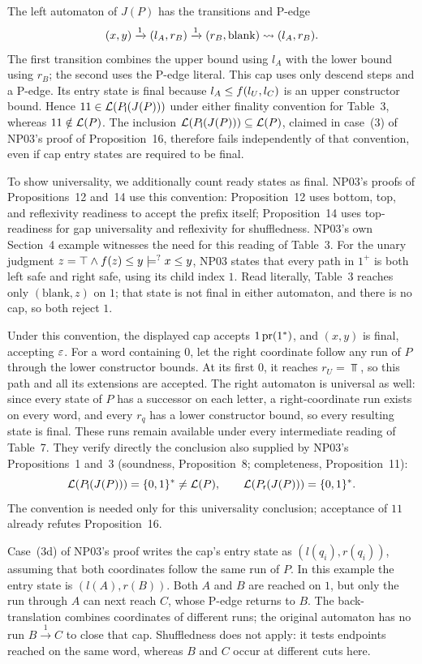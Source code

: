 The left automaton of $J(P)$ has the transitions and P-edge
\[
 (x,y)\xrightarrow{1}(l_A,r_B)
       \xrightarrow{1}(r_B,\text{blank})
       \rightsquigarrow(l_A,r_B).
\]
The first transition combines the upper bound using $l_A$ with the lower
bound using $r_B$; the second uses the P-edge literal.
This cap uses only descend steps and a P-edge. Its entry state is final
because $l_A\le f(l_U,l_C)$ is an upper constructor bound.
Hence $11\in\mathcal{L}(P_{\mathsf l}(J(P)))$ under either finality convention
for Table~3, whereas $11\notin\mathcal{L}(P)$. The inclusion
$\mathcal{L}(P_{\mathsf l}(J(P)))\subseteq\mathcal{L}(P)$, claimed in case~(3) of
NP03's proof of Proposition~16, therefore fails independently of that
convention, even if cap entry states are required to be final.

To show universality, we additionally count ready states as final.
NP03's proofs of Propositions~12 and~14 use this convention:
Proposition~12 uses bottom, top, and reflexivity readiness to accept
the prefix itself; Proposition~14 uses top-readiness for gap universality
and reflexivity for shuffledness. NP03's own Section~4 example witnesses
the need for this reading of Table~3. For the unary judgment
$z=\top\wedge f(z)\le y \models^{?} x \le y$, NP03 states that every path in
$1^+$ is both left safe and right safe, using its child index $1$.
Read literally, Table~3 reaches only $(\text{blank},z)$ on $1$;
that state is not final in either automaton, and there is no cap, so
both reject $1$.

Under this convention, the displayed cap accepts $1\operatorname{pr}(1^*)$, and
$(x,y)$ is final, accepting $\varepsilon$.
For a word containing $0$, let the right coordinate follow any run of
$P$ through the lower constructor bounds. At its first $0$, it reaches
$r_U=\Top$, so this path and all its extensions are accepted.
The right automaton is universal as well: since every state of $P$ has
a successor on each letter, a right-coordinate run exists on every word,
and every $r_q$ has a lower
constructor bound, so every resulting state is final.
These runs remain available under every intermediate reading of Table~7.
They verify directly the conclusion also supplied by NP03's
Propositions~1 and~3 (soundness, Proposition~8; completeness,
Proposition~11):
\[
 \mathcal{L}(P_{\mathsf l}(J(P)))=\{0,1\}^*\ne\mathcal{L}(P),
 \qquad \mathcal{L}(P_{\mathsf r}(J(P)))=\{0,1\}^*.
\]
The convention is needed only for this universality conclusion; acceptance
of $11$ already refutes Proposition~16.

Case~(3d) of NP03's proof writes the cap's entry state as
$(l(q_i),r(q_i))$, assuming that both coordinates follow the same run
of $P$. In this example the entry state is $(l(A),r(B))$.
Both $A$ and $B$ are reached on $1$, but only the run through $A$
can next reach $C$, whose P-edge returns to $B$.
The back-translation combines coordinates of different runs; the original
automaton has no run $B\xrightarrow{1}C$ to close that cap.
Shuffledness does not apply: it tests endpoints reached on the same
word, whereas $B$ and $C$ occur at different cuts here.

